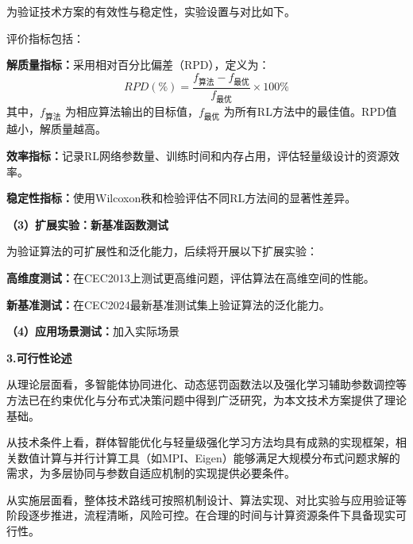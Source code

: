 \begin{titlepage}
为验证技术方案的有效性与稳定性，实验设置与对比如下。

评价指标包括：

\textbf{解质量指标：}采用相对百分比偏差（RPD），定义为：
\begin{equation}
RPD(\%) = \frac{f_{\text{算法}} - f_{\text{最优}}}{f_{\text{最优}}} \times 100\%
\end{equation}
其中，$f_{\text{算法}}$ 为相应算法输出的目标值，$f_{\text{最优}}$ 为所有RL方法中的最佳值。RPD值越小，解质量越高。

\textbf{效率指标：}记录RL网络参数量、训练时间和内存占用，评估轻量级设计的资源效率。

\textbf{稳定性指标：}使用Wilcoxon秩和检验评估不同RL方法间的显著性差异。

\textbf{（3）扩展实验：新基准函数测试}

为验证算法的可扩展性和泛化能力，后续将开展以下扩展实验：

\textbf{高维度测试：}在CEC2013上测试更高维问题，评估算法在高维空间的性能。

\textbf{新基准测试：}在CEC2024最新基准测试集上验证算法的泛化能力。

\textbf{（4）应用场景测试：}加入实际场景

\noindent 
\textbf{3.可行性论述}

\par
\indent
从理论层面看，多智能体协同进化、动态惩罚函数法以及强化学习辅助参数调控等方法已在约束优化与分布式决策问题中得到广泛研究，为本文技术方案提供了理论基础。

从技术条件上看，群体智能优化与轻量级强化学习方法均具有成熟的实现框架，相关数值计算与并行计算工具（如MPI、Eigen）能够满足大规模分布式问题求解的需求，为多层协同与参数自适应机制的实现提供必要条件。

从实施层面看，整体技术路线可按照机制设计、算法实现、对比实验与应用验证等阶段逐步推进，流程清晰，风险可控。在合理的时间与计算资源条件下具备现实可行性。


\end{titlepage}
